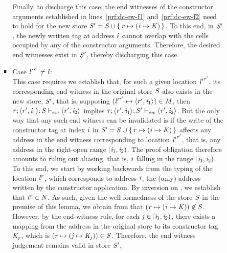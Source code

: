 \begin{nproof}
\begin{bcase}
\begin{itemize}
\begin{itemize}
\begin{itemize}
           Finally, to discharge this case, the end witnesses of the constructor
           arguments established in lines~\ref{prf:dc-ew-f1} and~\ref{prf:dc-ew-f2}
           need to hold for the new store
           $\mathit{S}' = \mathit{S} \cup \{ \, \mathit{r} \mapsto (\mathit{i} \mapsto \mathit{K}) \,\}$.
           To this end, in $\mathit{S}'$, the newly
           written tag at address $\mathit{i}$ cannot overlap with the cells
           occupied by any of the constructor arguments.
           Therefore, the desired end witnesses exist in $\mathit{S}'$, thereby
           discharging this case.
      \item Case ${\mathit{l}'}^{\mathit{r}'} \neq \mathit{l}$: \\
      This case requires we establish that, for such a given location ${\mathit{l}'}^{\mathit{r}'}$, its
      corresponding end witness in the original store $\mathit{S}$ also exists
      in the new store, $\mathit{S}'$, that is, supposing $({\mathit{l}'}^{\mathit{r}'} \mapsto \langle \mathit{r}', \mathit{i}_1 \rangle ^{}) \in \mathit{M}$, then $\mathit{\tau};\langle \mathit{r}', \mathit{i}_1 \rangle ^{};\mathit{S} \vdash_{ew} \langle \mathit{r}', \mathit{i}_2 \rangle ^{}$ implies $\mathit{\tau};\langle \mathit{r}', \mathit{i}_1 \rangle ^{};\mathit{S}' \vdash_{ew} \langle \mathit{r}', \mathit{i}_2 \rangle ^{}$.
      But the only way that any such end witness can be invalidated
      is if the write of the constructor tag at index $\mathit{i}$ in
      $\mathit{S}' = \mathit{S} \cup \{ \, \mathit{r} \mapsto (\mathit{i} \mapsto \mathit{K}) \,\}$ affects
      any address in the end witness corresponding
      to location ${\mathit{l}'}^{\mathit{r}'}$, that is, any address
      in the right-open range $[\mathit{i}_1, \mathit{i}_2)$.
      The proof obligation therefore amounts to ruling out
      aliasing, that is, $\mathit{i}$ falling in the range
      $[\mathit{i}_1, \mathit{i}_2)$.
      To this end, we start by working backwards from the typing of
      the location ${\mathit{l}}^{\mathit{r}}$, which corresponds to address $\mathit{i}$, the (only) address
      written by the constructor application.
      By inversion on \tdatacon{}, we establish that ${\mathit{l}}^{\mathit{r}} \in \mathit{N}$.
      As such, given the well formedness of the store $\mathit{S}$ in the premise
      of this lemma, we obtain
      from 
      that
      $(\mathit{r} \mapsto (\mathit{i} \mapsto \mathit{K})) \not \in \mathit{S}$.
      However, by the end-witness rule, for each $\mathit{j} \in [\mathit{i}_1, \mathit{i}_2)$,
      there exists a mapping from the address in the original store to its constructor tag
      $\mathit{K}_j$, which is
      $(\mathit{r} \mapsto (\mathit{j} \mapsto \mathit{K}_j)) \in \mathit{S}$.
      Therefore, the end witness judgement remains valid in store $\mathit{S}'$,

\end{itemize}
\end{itemize}
\end{itemize}
\end{bcase}
\end{nproof}
